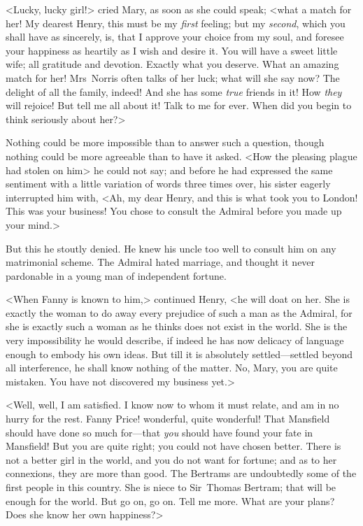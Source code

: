<Lucky, lucky girl!> cried Mary, as soon as she could speak; <what a match for her! My dearest Henry, this must be my \textit{first}  feeling; but my \textit{second}, which you shall have as sincerely, is, that I approve your choice from my soul, and foresee your happiness as heartily as I wish and desire it. You will have a sweet little wife; all gratitude and devotion. Exactly what you deserve. What an amazing match for her! Mrs~Norris often talks of her luck; what will she say now? The delight of all the family, indeed! And she has some \textit{true}  friends in it! How \textit{they}  will rejoice! But tell me all about it! Talk to me for ever. When did you begin to think seriously about her?>

Nothing could be more impossible than to answer such a question, though nothing could be more agreeable than to have it asked. <How the pleasing plague had stolen on him> he could not say; and before he had expressed the same sentiment with a little variation of words three times over, his sister eagerly interrupted him with, <Ah, my dear Henry, and this is what took you to London! This was your business! You chose to consult the Admiral before you made up your mind.>

But this he stoutly denied. He knew his uncle too well to consult him on any matrimonial scheme. The Admiral hated marriage, and thought it never pardonable in a young man of independent fortune.

<When Fanny is known to him,> continued Henry, <he will doat on her. She is exactly the woman to do away every prejudice of such a man as the Admiral, for she is exactly such a woman as he thinks does not exist in the world. She is the very impossibility he would describe, if indeed he has now delicacy of language enough to embody his own ideas. But till it is absolutely settled—settled beyond all interference, he shall know nothing of the matter. No, Mary, you are quite mistaken. You have not discovered my business yet.>

<Well, well, I am satisfied. I know now to whom it must relate, and am in no hurry for the rest. Fanny Price! wonderful, quite wonderful! That Mansfield should have done so much for—that \textit{you}  should have found your fate in Mansfield! But you are quite right; you could not have chosen better. There is not a better girl in the world, and you do not want for fortune; and as to her connexions, they are more than good. The Bertrams are undoubtedly some of the first people in this country. She is niece to Sir~Thomas Bertram; that will be enough for the world. But go on, go on. Tell me more. What are your plans? Does she know her own happiness?>

